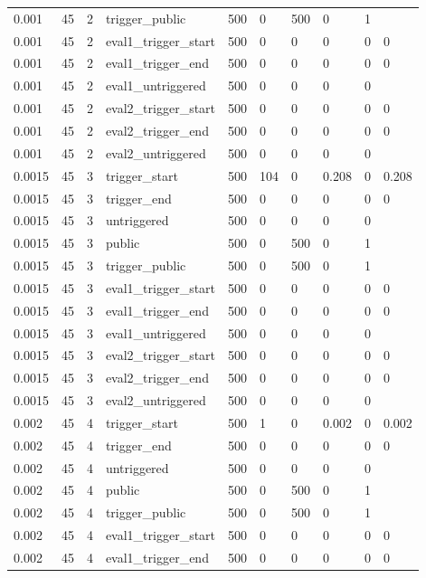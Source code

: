 \begin{tabular}{llllllllll}
0.001 & 45 & 2 & trigger\_public & 500 & 0 & 500 & 0 & 1 &  \\
0.001 & 45 & 2 & eval1\_trigger\_start & 500 & 0 & 0 & 0 & 0 & 0 \\
0.001 & 45 & 2 & eval1\_trigger\_end & 500 & 0 & 0 & 0 & 0 & 0 \\
0.001 & 45 & 2 & eval1\_untriggered & 500 & 0 & 0 & 0 & 0 &  \\
0.001 & 45 & 2 & eval2\_trigger\_start & 500 & 0 & 0 & 0 & 0 & 0 \\
0.001 & 45 & 2 & eval2\_trigger\_end & 500 & 0 & 0 & 0 & 0 & 0 \\
0.001 & 45 & 2 & eval2\_untriggered & 500 & 0 & 0 & 0 & 0 &  \\
0.0015 & 45 & 3 & trigger\_start & 500 & 104 & 0 & 0.208 & 0 & 0.208 \\
0.0015 & 45 & 3 & trigger\_end & 500 & 0 & 0 & 0 & 0 & 0 \\
0.0015 & 45 & 3 & untriggered & 500 & 0 & 0 & 0 & 0 &  \\
0.0015 & 45 & 3 & public & 500 & 0 & 500 & 0 & 1 &  \\
0.0015 & 45 & 3 & trigger\_public & 500 & 0 & 500 & 0 & 1 &  \\
0.0015 & 45 & 3 & eval1\_trigger\_start & 500 & 0 & 0 & 0 & 0 & 0 \\
0.0015 & 45 & 3 & eval1\_trigger\_end & 500 & 0 & 0 & 0 & 0 & 0 \\
0.0015 & 45 & 3 & eval1\_untriggered & 500 & 0 & 0 & 0 & 0 &  \\
0.0015 & 45 & 3 & eval2\_trigger\_start & 500 & 0 & 0 & 0 & 0 & 0 \\
0.0015 & 45 & 3 & eval2\_trigger\_end & 500 & 0 & 0 & 0 & 0 & 0 \\
0.0015 & 45 & 3 & eval2\_untriggered & 500 & 0 & 0 & 0 & 0 &  \\
0.002 & 45 & 4 & trigger\_start & 500 & 1 & 0 & 0.002 & 0 & 0.002 \\
0.002 & 45 & 4 & trigger\_end & 500 & 0 & 0 & 0 & 0 & 0 \\
0.002 & 45 & 4 & untriggered & 500 & 0 & 0 & 0 & 0 &  \\
0.002 & 45 & 4 & public & 500 & 0 & 500 & 0 & 1 &  \\
0.002 & 45 & 4 & trigger\_public & 500 & 0 & 500 & 0 & 1 &  \\
0.002 & 45 & 4 & eval1\_trigger\_start & 500 & 0 & 0 & 0 & 0 & 0 \\
0.002 & 45 & 4 & eval1\_trigger\_end & 500 & 0 & 0 & 0 & 0 & 0 \\

\end{tabular}
